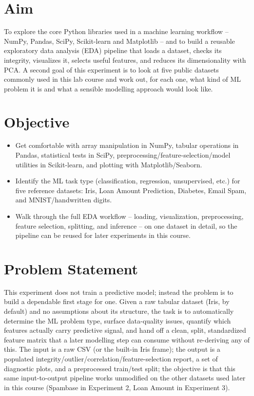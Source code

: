 \documentclass[11pt,a4paper]{article}
\begin{document}
\section{Aim}
To explore the core Python libraries used in a machine learning workflow -- NumPy, Pandas, SciPy, Scikit-learn and Matplotlib -- and to build a reusable exploratory data analysis (EDA) pipeline that loads a dataset, checks its integrity, visualizes it, selects useful features, and reduces its dimensionality with PCA. A second goal of this experiment is to look at five public datasets commonly used in this lab course and work out, for each one, what kind of ML problem it is and what a sensible modelling approach would look like.

\section{Objective}
\begin{itemize}[nosep]
  \item Get comfortable with array manipulation in NumPy, tabular operations in Pandas, statistical tests in SciPy, preprocessing/feature-selection/model utilities in Scikit-learn, and plotting with Matplotlib/Seaborn.
  \item Identify the ML task type (classification, regression, unsupervised, etc.) for five reference datasets: Iris, Loan Amount Prediction, Diabetes, Email Spam, and MNIST/handwritten digits.
  \item Walk through the full EDA workflow -- loading, visualization, preprocessing, feature selection, splitting, and inference -- on one dataset in detail, so the pipeline can be reused for later experiments in this course.
\end{itemize}

\section{Problem Statement}
This experiment does not train a predictive model; instead the problem is to build a dependable first stage for one. Given a raw tabular dataset (Iris, by default) and no assumptions about its structure, the task is to automatically determine the ML problem type, surface data-quality issues, quantify which features actually carry predictive signal, and hand off a clean, split, standardized feature matrix that a later modelling step can consume without re-deriving any of this. The input is a raw CSV (or the built-in Iris frame); the output is a populated integrity/outlier/correlation/feature-selection report, a set of diagnostic plots, and a preprocessed train/test split; the objective is that this same input-to-output pipeline works unmodified on the other datasets used later in this course (Spambase in Experiment 2, Loan Amount in Experiment 3).
\end{document}

